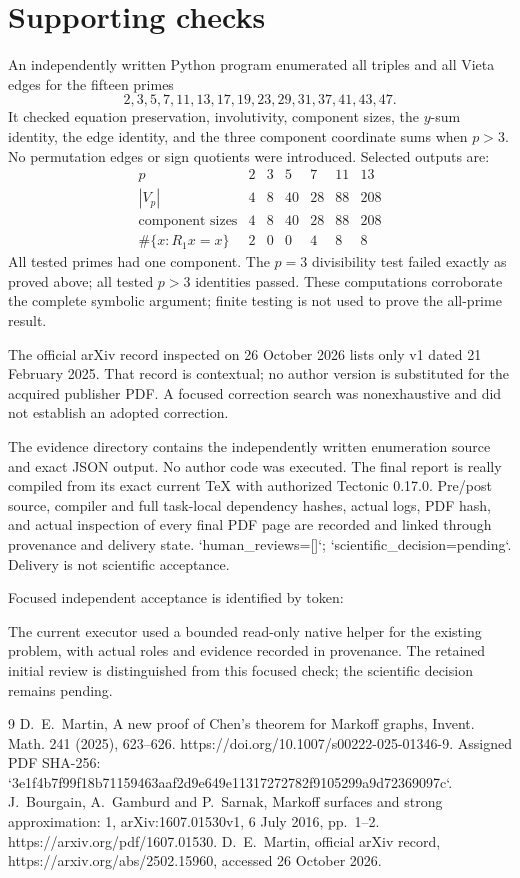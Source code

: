 \documentclass[10pt]{article}
\begin{document}
\section*{Supporting checks}
An independently written Python program enumerated all triples and all Vieta edges for the fifteen primes \[2,3,5,7,11,13,17,19,23,29,31,37,41,43,47.\] It checked equation preservation, involutivity, component sizes, the \(y\)-sum identity, the edge identity, and the three component coordinate sums when \(p>3\). No permutation edges or sign quotients were introduced. Selected outputs are: \[\begin{array}{c|rrrrrr}
p&2&3&5&7&11&13\\ \hline
|V_p|&4&8&40&28&88&208\\
\text{component sizes}&4&8&40&28&88&208\\
\#\{x:R_1x=x\}&2&0&0&4&8&8
\end{array}\] All tested primes had one component. The \(p=3\) divisibility test failed exactly as proved above; all tested \(p>3\) identities passed. These computations corroborate the complete symbolic argument; finite testing is not used to prove the all-prime result.\par
The official arXiv record inspected on 26 October 2026 lists only v1 dated 21 February 2025. That record is contextual; no author version is substituted for the acquired publisher PDF. A focused correction search was nonexhaustive and did not establish an adopted correction.\par
The evidence directory contains the independently written enumeration source and exact JSON output. No author code was executed. The final report is really compiled from its exact current TeX with authorized Tectonic 0.17.0. Pre/post source, compiler and full task-local dependency hashes, actual logs, PDF hash, and actual inspection of every final PDF page are recorded and linked through provenance and delivery state. `human\_reviews=[]`; `scientific\_decision=pending`. Delivery is not scientific acceptance.\par
Focused independent acceptance is identified by token:\par
The current executor used a bounded read-only native helper for the existing problem, with actual roles and evidence recorded in provenance. The retained initial review is distinguished from this focused check; the scientific decision remains pending.\par
9 D. E. Martin, A new proof of Chen’s theorem for Markoff graphs, Invent. Math. 241 (2025), 623–626. https://doi.org/10.1007/s00222-025-01346-9. Assigned PDF SHA-256: `3e1f4b7f99f18b71159463aaf2d9e649e11317272782f9105299a9d72369097c`. J. Bourgain, A. Gamburd and P. Sarnak, Markoff surfaces and strong approximation: 1, arXiv:1607.01530v1, 6 July 2016, pp. 1–2. https://arxiv.org/pdf/1607.01530. D. E. Martin, official arXiv record, https://arxiv.org/abs/2502.15960, accessed 26 October 2026.\par
\end{document}
